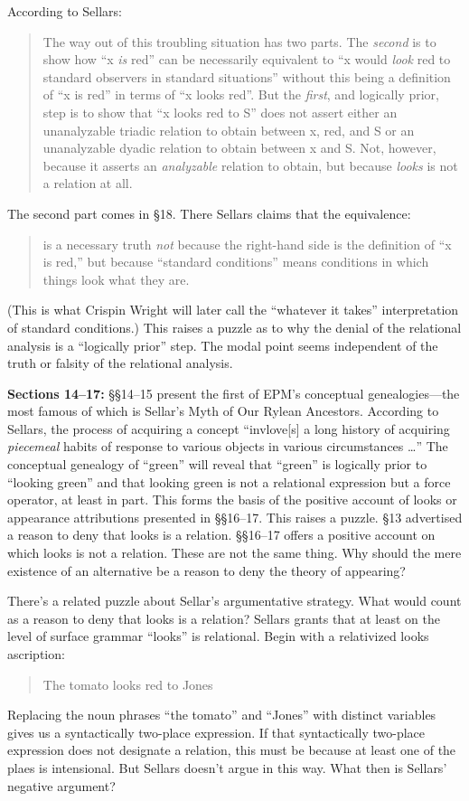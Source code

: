 \documentclass[11pt]{article}
\begin{document}
According to Sellars:
\begin{quote}
    The way out of this troubling situation has two parts. The \emph{second} is to show how ``x \emph{is} red'' can be necessarily equivalent to ``x would \emph{look} red to standard observers in standard situations'' without this being a definition of ``x is red'' in terms of ``x looks red''. But the \emph{first}, and logically prior, step is to show that ``x looks red to S'' does not assert either an unanalyzable triadic relation to obtain between x, red, and S or an unanalyzable dyadic relation to obtain between x and S. Not, however, because it asserts an \emph{analyzable} relation to obtain, but because \emph{looks} is not a relation at all.
\end{quote}
The second part comes in §18. There Sellars claims that the equivalence:
\begin{quote}
    is a necessary truth \emph{not} because the right-hand side is the definition of ``x is red,'' but because ``standard conditions'' means conditions in which things look what they are.
\end{quote}
(This is what Crispin Wright will later call the ``whatever it takes'' interpretation of standard conditions.) This raises a puzzle as to why the denial of the relational analysis is a ``logically prior'' step. The modal point seems independent of the truth or falsity of the relational analysis.

\textbf{Sections 14--17:} §§14--15 present the first of EPM's conceptual genealogies---the most famous of which is Sellar's Myth of Our Rylean Ancestors. According to Sellars, the process of acquiring a concept ``invlove[s] a long history of acquiring \emph{piecemeal} habits of response to various objects in various circumstances \ldots'' The conceptual genealogy of ``green'' will reveal that ``green'' is logically prior to ``looking green'' and that looking green is not a relational expression but a force operator, at least in part. This forms the basis of the positive account of looks or appearance attributions presented in §§16--17. This raises a puzzle. §13 advertised a reason to deny that looks is a relation. §§16--17 offers a positive account on which looks is not a relation. These are not the same thing. Why should the mere existence of an alternative be a reason to deny the theory of appearing? 

There's a related puzzle about Sellar's argumentative strategy. What would count as a reason to deny that looks is a relation? Sellars grants that at least on the level of surface grammar ``looks'' is relational. Begin with a relativized looks ascription:
\begin{quote}
    The tomato looks red to Jones
\end{quote}
Replacing the noun phrases ``the tomato'' and ``Jones'' with distinct variables gives us a syntactically two-place expression. If that syntactically two-place expression does not designate a relation, this must be because at least one of the plaes is intensional. But Sellars doesn't argue in this way. What then is Sellars' negative argument?
\end{document}
